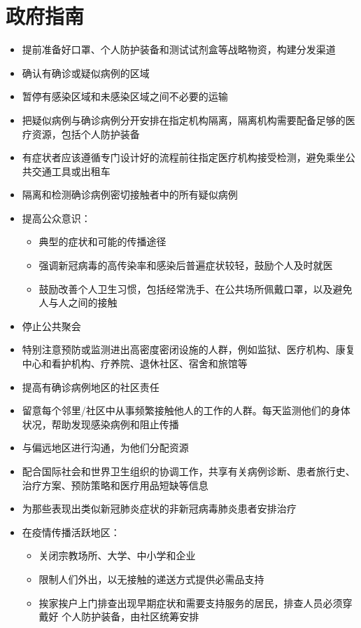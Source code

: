 \documentclass[onecolumn,journal]{IEEEtran}
\begin{document}
\begin{multicols}{2}
\begin{itemize}
\end{itemize}

\vspace{2ex}

\section*{政府指南}
\begin{itemize}
\item 提前准备好口罩、个人防护装备和测试试剂盒等战略物资，构建分发渠道
\item 确认有确诊或疑似病例的区域
\item 暂停有感染区域和未感染区域之间不必要的运输
\item 把疑似病例与确诊病例分开安排在指定机构隔离，隔离机构需要配备足够的医疗资源，包括个人防护装备
\item 有症状者应该遵循专门设计好的流程前往指定医疗机构接受检测，避免乘坐公共交通工具或出租车
\item 隔离和检测确诊病例密切接触者中的所有疑似病例
\item 提高公众意识：
  \begin{itemize}
  \item 典型的症状和可能的传播途径
  \item 强调新冠病毒的高传染率和感染后普遍症状较轻，鼓励个人及时就医
  \item 鼓励改善个人卫生习惯，包括经常洗手、在公共场所佩戴口罩，以及避免人与人之间的接触
  \end{itemize}
\item 停止公共聚会
\item 特别注意预防或监测进出高密度密闭设施的人群，例如监狱、医疗机构、康复中心和看护机构、疗养院、退休社区、宿舍和旅馆等
\item 提高有确诊病例地区的社区责任
\item 留意每个邻里/社区中从事频繁接触他人的工作的人群。每天监测他们的身体状况，帮助发现感染病例和阻止传播
\item 与偏远地区进行沟通，为他们分配资源
\item 配合国际社会和世界卫生组织的协调工作，共享有关病例诊断、患者旅行史、治疗方案、预防策略和医疗用品短缺等信息
\item 为那些表现出类似新冠肺炎症状的非新冠病毒肺炎患者安排治疗
\item 在疫情传播活跃地区：
  \begin{itemize}
  \item 关闭宗教场所、大学、中小学和企业
  \item 限制人们外出，以无接触的递送方式提供必需品支持
  \item 挨家挨户上门排查出现早期症状和需要支持服务的居民，排查人员必须穿戴好 个人防护装备，由社区统筹安排
  \end{itemize}
\end{itemize}

\end{multicols}
\end{document}
